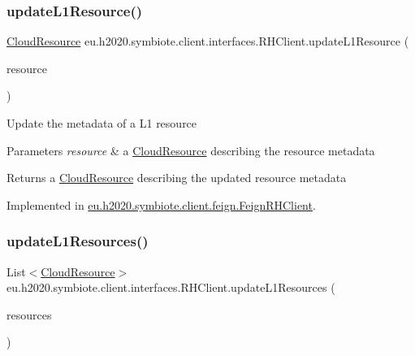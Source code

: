 \subsubsection{\texorpdfstring{update\+L1\+Resource()}{updateL1Resource()}}
{\footnotesize\ttfamily \hyperlink{classeu_1_1h2020_1_1symbiote_1_1cloud_1_1model_1_1internal_1_1CloudResource}{Cloud\+Resource} eu.\+h2020.\+symbiote.\+client.\+interfaces.\+R\+H\+Client.\+update\+L1\+Resource (\begin{DoxyParamCaption}\item[{\hyperlink{classeu_1_1h2020_1_1symbiote_1_1cloud_1_1model_1_1internal_1_1CloudResource}{Cloud\+Resource}}]{resource }\end{DoxyParamCaption})}

Update the metadata of a L1 resource


\begin{DoxyParams}{Parameters}
{\em resource} & a \hyperlink{}{Cloud\+Resource} describing the resource metadata \\
\hline
\end{DoxyParams}
\begin{DoxyReturn}{Returns}
a \hyperlink{}{Cloud\+Resource} describing the updated resource metadata 
\end{DoxyReturn}


Implemented in \hyperlink{classeu_1_1h2020_1_1symbiote_1_1client_1_1feign_1_1FeignRHClient_a447837da729d2022e118cb22887d993d}{eu.\+h2020.\+symbiote.\+client.\+feign.\+Feign\+R\+H\+Client}.

\mbox{\label{interfaceeu_1_1h2020_1_1symbiote_1_1client_1_1interfaces_1_1RHClient_a91c3ca12af4ec03fb196736953b690db}} 
\subsubsection{\texorpdfstring{update\+L1\+Resources()}{updateL1Resources()}}
{\footnotesize\ttfamily List$<$\hyperlink{classeu_1_1h2020_1_1symbiote_1_1cloud_1_1model_1_1internal_1_1CloudResource}{Cloud\+Resource}$>$ eu.\+h2020.\+symbiote.\+client.\+interfaces.\+R\+H\+Client.\+update\+L1\+Resources (\begin{DoxyParamCaption}\item[{List$<$ \hyperlink{classeu_1_1h2020_1_1symbiote_1_1cloud_1_1model_1_1internal_1_1CloudResource}{Cloud\+Resource} $>$}]{resources }\end{DoxyParamCaption})}

